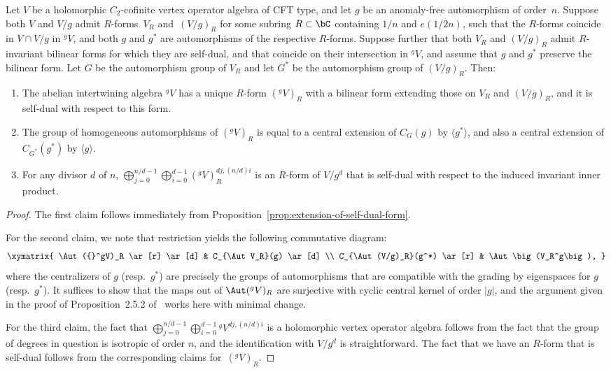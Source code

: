\begin{prop} \label{prop:R-form-for-abelian-intertwining-algebra}Let $V$ be a holomorphic $C_2$-cofinite vertex operator algebra of CFT type, and let $g$ be an anomaly-free automorphism of order~$n$. Suppose both $V$ and $V/g$ admit $R$-forms~$V_R$ and~$(V/g)_R$ for some subring $R \subset \bC$ containing $1/n$ and $e(1/2n)$, such that the $R$-forms coincide in $V \cap V/g$ in ${}^gV$, and both $g$ and $g^*$ are automorphisms of the respective $R$-forms. Suppose further that both $V_R$ and $(V/g)_R$ admit $R$-invariant bilinear forms for which they are self-dual, and that coincide on their intersection in ${}^gV$, and assume that $g$ and $g^*$ preserve the bilinear form. Let $G$ be the automorphism group of $V_R$ and let $G^*$ be the automorphism group of $(V/g)_R$. Then:
\begin{enumerate}\itemsep=0pt
\item[$1.$] The abelian intertwining algebra ${}^gV$ has a unique $R$-form $({}^gV)_R$ with a bilinear form extending those on $V_R$ and $(V/g)_R$, and it is self-dual with respect to this form.
\item[$2.$] The group of homogeneous automorphisms of $({}^gV)_R$ is equal to a central extension of $C_G(g)$ by $\langle g^* \rangle$, and also a central extension of $C_{G^*}(g^*)$ by $\langle g \rangle$.
\item[$3.$] For any divisor $d$ of $n$, $\bigoplus_{j=0}^{n/d-1} \bigoplus_{i=0}^{d-1} ({}^gV)_R^{dj,(n/d)i}$ is an $R$-form of $V/g^d$ that is self-dual with respect to the induced invariant inner product.
\end{enumerate}
\end{prop}
\begin{proof}The first claim follows immediately from Proposition~\ref{prop:extension-of-self-dual-form}.

For the second claim, we note that restriction yields the following commutative diagram:
\begin{gather*} \xymatrix{ \Aut({}^gV)_R \ar[r] \ar[d] & C_{\Aut V_R}(g) \ar[d] \\ C_{\Aut (V/g)_R}(g^*) \ar[r] & \Aut \big(V_R^g\big), } \end{gather*}
where the centralizers of $g$ (resp.~$g^*$) are precisely the groups of automorphisms that are compatible with the grading by eigenspaces for $g$ (resp.~$g^*$). It suffices to show that the maps out of $\Aut({}^gV)_R$ are surjective with cyclic central kernel of order $|g|$, and the argument given in the proof of Proposition~2.5.2 of~\cite{GM4} works here with minimal change.

For the third claim, the fact that $\bigoplus_{j=0}^{n/d-1} \bigoplus_{i=0}^{d-1} {}^gV^{dj,(n/d)i}$ is a holomorphic vertex operator algebra follows from the fact that the group of degrees in question is isotropic of order $n$, and the identification with $V/g^d$ is straightforward. The fact that we have an $R$-form that is self-dual follows from the corresponding claims for~$({}^gV)_R$.
\end{proof}

